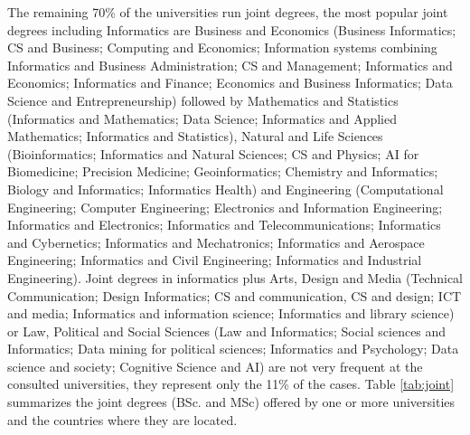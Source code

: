 The remaining 70\% of the universities run joint degrees, the most popular joint degrees including Informatics are  Business and Economics (Business Informatics; CS and Business; Computing and Economics; Information systems combining Informatics and Business Administration; CS and Management; Informatics and Economics; Informatics and Finance; Economics and Business Informatics; Data Science and Entrepreneurship) followed by Mathematics and Statistics (Informatics and Mathematics; Data Science; Informatics and Applied Mathematics; Informatics and Statistics), Natural and Life Sciences (Bioinformatics; Informatics and Natural Sciences; CS and Physics; AI for Biomedicine; Precision Medicine; Geoinformatics; Chemistry and Informatics; Biology and Informatics; Informatics Health) and Engineering (Computational Engineering; Computer Engineering; Electronics and Information Engineering; Informatics and Electronics; Informatics and Telecommunications; Informatics and Cybernetics; Informatics and Mechatronics; Informatics and Aerospace Engineering; Informatics and Civil Engineering; Informatics and Industrial Engineering). Joint degrees in informatics plus Arts, Design and Media (Technical Communication; Design Informatics; CS and communication, CS and design; ICT and media; Informatics and information science; Informatics and library science) or Law, Political and Social Sciences (Law and Informatics; Social sciences and Informatics; Data mining for political sciences; Informatics and Psychology; Data science and society; Cognitive Science and AI) are not very frequent at the consulted universities, they represent only the 11\% of the cases. Table \ref{tab:joint} summarizes  the joint degrees (BSc. and MSc) offered by one or more universities and the countries where they are located.

